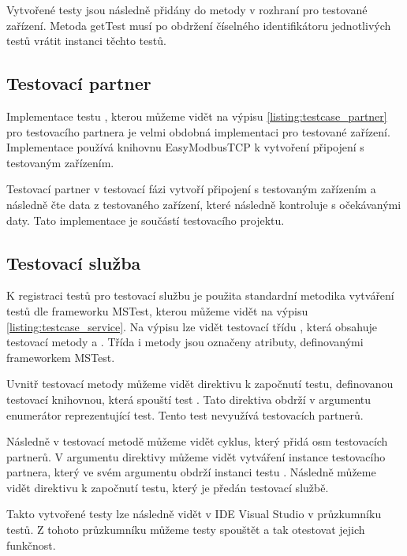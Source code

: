 Vytvořené testy jsou následně přidány do metody  v rozhraní pro testované zařízení. Metoda getTest musí po obdržení číselného identifikátoru jednotlivých testů vrátit instanci těchto testů.


\subsection{Testovací partner}
Implementace testu , kterou můžeme vidět na výpisu \ref{listing:testcase_partner} pro testovacího partnera je velmi obdobná implementaci pro testované zařízení. Implementace používá knihovnu EasyModbusTCP k vytvoření připojení s testovaným zařízením. 

Testovací partner v testovací fázi vytvoří připojení s testovaným zařízením a následně čte data z testovaného zařízení, které následně kontroluje s očekávanými daty. Tato implementace je součástí testovacího projektu.


\subsection{Testovací služba}

K registraci testů pro testovací službu je použita standardní metodika vytváření testů dle frameworku MSTest, kterou můžeme vidět na výpisu \ref{listing:testcase_service}. Na výpisu lze vidět testovací třídu , která obsahuje testovací metody  a . Třída i metody jsou označeny atributy, definovanými frameworkem MSTest. 

Uvnitř testovací metody  můžeme vidět direktivu k započnutí testu, definovanou testovací knihovnou, která spouští test . Tato direktiva obdrží v argumentu enumerátor reprezentující test. Tento test nevyužívá testovacích partnerů. 

Následně v testovací metodě  můžeme vidět cyklus, který přidá osm testovacích partnerů. V argumentu direktivy můžeme vidět vytváření instance testovacího partnera, který ve svém argumentu obdrží instanci testu . Následně můžeme vidět direktivu k započnutí testu, který je předán testovací službě. 

Takto vytvořené testy lze následně vidět v IDE Visual Studio v průzkumníku testů. Z tohoto průzkumníku můžeme testy spouštět a tak otestovat jejich funkčnost.  


